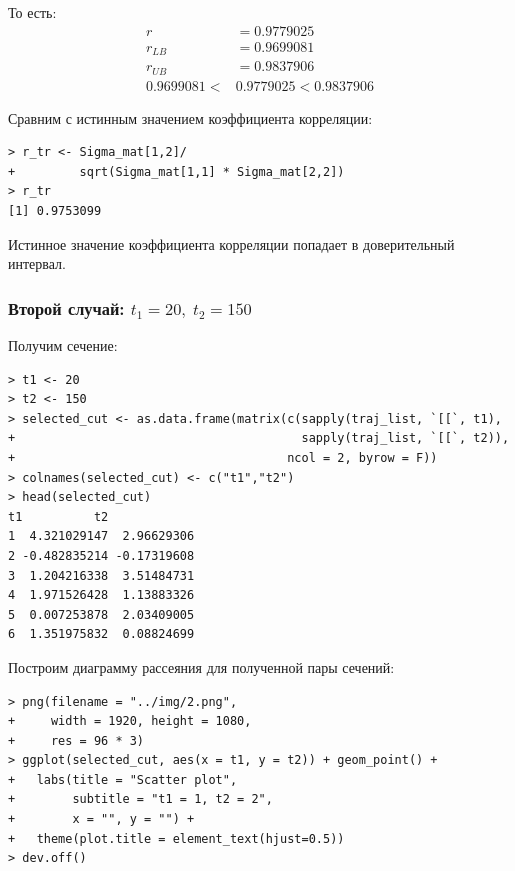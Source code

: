 \documentclass[14pt,a4paper]{scrartcl}
\begin{document}
То есть:
\begin{align*}
	r &= 0.9779025\\
	r_{LB} &= 0.9699081\\
	r_{UB} &= 0.9837906\\
	0.9699081 < &0.9779025 < 0.9837906
\end{align*}
\begin{tcolorbox}[colback=red!5!white,colframe=red!75!black]
	Сравним с истинным значением коэффициента корреляции:
\begin{verbatim}
> r_tr <- Sigma_mat[1,2]/
+         sqrt(Sigma_mat[1,1] * Sigma_mat[2,2])
> r_tr
[1] 0.9753099
\end{verbatim}
	
	Истинное значение коэффициента корреляции попадает в доверительный интервал.
\end{tcolorbox}


\pagebreak
\subsubsection*{Второй случай: $t_1 = 20, \; t_2 = 150$}
Получим сечение:

\begin{verbatim}
> t1 <- 20
> t2 <- 150
> selected_cut <- as.data.frame(matrix(c(sapply(traj_list, `[[`, t1),
+                                        sapply(traj_list, `[[`, t2)),
+                                      ncol = 2, byrow = F))
> colnames(selected_cut) <- c("t1","t2")
> head(selected_cut)
t1          t2
1  4.321029147  2.96629306
2 -0.482835214 -0.17319608
3  1.204216338  3.51484731
4  1.971526428  1.13883326
5  0.007253878  2.03409005
6  1.351975832  0.08824699
\end{verbatim}

Построим диаграмму рассеяния для полученной пары сечений:

\begin{verbatim}
> png(filename = "../img/2.png",
+     width = 1920, height = 1080,
+     res = 96 * 3)
> ggplot(selected_cut, aes(x = t1, y = t2)) + geom_point() +
+   labs(title = "Scatter plot",
+        subtitle = "t1 = 1, t2 = 2",
+        x = "", y = "") + 
+   theme(plot.title = element_text(hjust=0.5))
> dev.off()
\end{verbatim}
\end{document}
